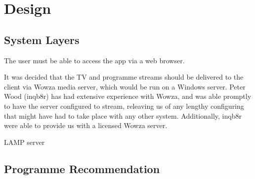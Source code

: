 \section{Design}

\subsection{System Layers}
The user must be able to access the app via a web browser.

It was decided that the TV and programme streams should be delivered to the client via Wowza media server, which would be run on a Windows server. Peter Wood (inqb8r) has had extensive experience with Wowza, and was able promptly to have the server configured to stream, releaving us of any lengthy configuring that might have had to take place with any other system. Additionally, inqb8r were able to provide us with a licensed Wowza server.

LAMP server

\subsection{Programme Recommendation}

